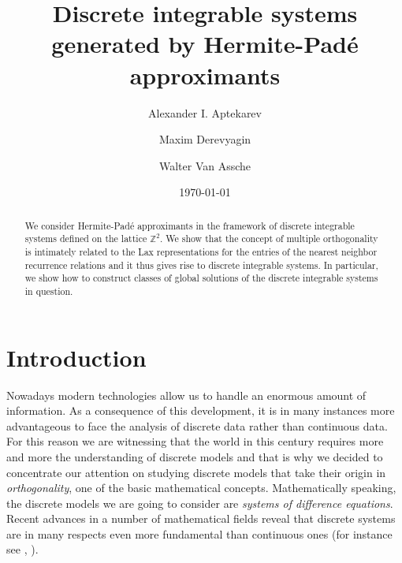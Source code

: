 \documentclass{amsart}
\author{Alexander I. Aptekarev}
\author{Maxim Derevyagin}
\author{Walter Van Assche}
\date{\today}
\theoremstyle{remark}
\numberwithin{equation}{section}
\begin{document}
\title[Discrete integrable systems generated by HP approximants]{Discrete integrable systems generated by
Hermite-Pad\'e approximants}

\begin{abstract}
We consider {Her\-mite-Pad\'e}{} approximants in the framework of
discrete integrable systems defined on the lattice ${{\mathbb Z}}^2$. We show that the concept of multiple orthogonality is intimately related to the Lax representations for the entries of the nearest neighbor recurrence relations and it thus gives rise to discrete integrable systems. In particular, we show how to construct  classes of global solutions of the discrete integrable systems in question.
\end{abstract}

\maketitle

\section{Introduction}\label{sec:1}

Nowadays modern technologies allow us to handle an enormous amount of information. As a consequence of this development, it is in many instances more advantageous to face the analysis of discrete data rather than continuous data. For this reason we are witnessing that the world in this century
requires more and more the understanding of discrete models and that is why we decided to concentrate our attention on studying discrete models that take their origin in \textit{orthogonality}, one of the basic mathematical concepts.
Mathematically speaking, the discrete models we are going to consider are \textit{systems of difference equations}. Recent advances in a number of mathematical fields reveal that discrete systems are in many respects even more fundamental than continuous ones (for instance see \cite{Nov},  \cite{S2010}).
\end{document}
